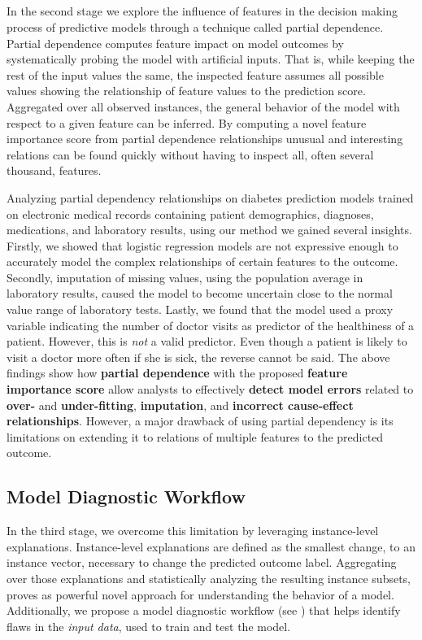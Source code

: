 \subsection{\emph{\prospector}}
In the second stage we explore the influence of features in the decision making process of predictive models through a technique called partial dependence. Partial dependence computes feature impact on model outcomes by systematically probing the model with artificial inputs. That is, while keeping the rest of the input values the same, the inspected feature assumes all possible values showing the relationship of feature values to the prediction score. Aggregated over all observed instances, the general behavior of the model with respect to a given feature can be inferred. By computing a novel feature importance score from partial dependence relationships unusual and interesting relations can be found quickly without having to inspect all, often several thousand, features.

Analyzing partial dependency relationships on diabetes prediction models trained on electronic medical records containing patient demographics, diagnoses, medications, and laboratory results, using our method we gained several insights. Firstly, we showed that logistic regression models are not expressive enough to accurately model the complex relationships of certain features to the outcome. Secondly, imputation of missing values, using the population average in laboratory results, caused the model to become uncertain close to the normal value range of laboratory tests. Lastly, we found that the model used a proxy variable indicating the number of doctor visits as predictor of the healthiness of a patient.
However, this is \emph{not} a valid predictor.
Even though a patient is likely to visit a doctor more often if she is sick, the reverse cannot be said. The above findings show how \textbf{partial dependence} with the proposed \textbf{feature importance score} allow analysts to effectively \textbf{detect model errors} related to \textbf{over-} and \textbf{under-fitting}, \textbf{imputation}, and \textbf{incorrect cause-effect relationships}.
However, a major drawback of using partial dependency is its limitations on extending it to relations of multiple features to the predicted outcome.



\subsection{Model Diagnostic Workflow}
In the third stage, we overcome this limitation by leveraging instance-level explanations. Instance-level explanations are defined as the smallest change, to an instance vector, necessary to change the predicted outcome label. Aggregating over those explanations and statistically analyzing the resulting instance subsets, proves as powerful novel approach for understanding the behavior of a model. Additionally, we propose a model diagnostic workflow (see ) that helps identify flaws in the \emph{input data}, used to train and test the model.

